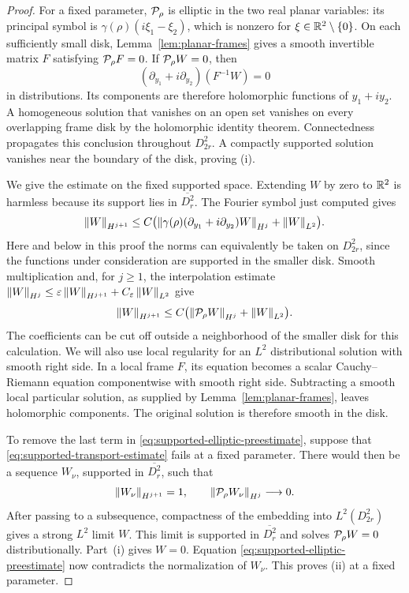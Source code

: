 \begin{proof}
For a fixed parameter, $\mathcal P_\rho$ is elliptic in the two real planar
variables: its principal symbol is
$\gamma(\rho)(i\xi_1-\xi_2)$, which is nonzero for
$\xi\in\mathbb R^2\setminus\{0\}$. On each sufficiently small disk,
Lemma~\ref{lem:planar-frames} gives a smooth invertible matrix $F$
satisfying $\mathcal P_\rho F=0$. If $\mathcal P_\rho W=0$, then
\[
 (\partial_{y_1}+i\partial_{y_2})(F^{-1}W)=0
\]
in distributions. Its components are therefore holomorphic functions
of $y_1+iy_2$. A homogeneous solution that vanishes on an open set
vanishes on every overlapping frame disk by the holomorphic identity
theorem. Connectedness propagates this conclusion throughout
$D_{2r}^2$. A compactly supported solution vanishes near the boundary
of the disk, proving \textup{(i)}.

We give the estimate on the fixed supported space. Extending $W$ by
zero to $\mathbb R^2$ is harmless because its support lies in $\overline{D_r^2}$.
The Fourier symbol just computed gives
\[
 \left\lVert W\right\rVert_{H^{j+1}}
 \leq C\bigl(
    \left\lVert \gamma(\rho)(\partial_{y_1}+i\partial_{y_2})W\right\rVert_{H^j}
       +\left\lVert W\right\rVert_{L^2}\bigr).
\]
Here and below in this proof the norms can equivalently be taken on
$D_{2r}^2$, since the functions under consideration are supported in
the smaller disk. Smooth multiplication and, for $j\geq1$, the
interpolation estimate
$\left\lVert W\right\rVert_{H^j}\leq\varepsilon\left\lVert W\right\rVert_{H^{j+1}}
 +C_\varepsilon\left\lVert W\right\rVert_{L^2}$ give
\begin{equation}\label{eq:supported-elliptic-preestimate}
 \left\lVert W\right\rVert_{H^{j+1}}
 \leq C\bigl(\left\lVert \mathcal P_\rho W\right\rVert_{H^j}
                  +\left\lVert W\right\rVert_{L^2}\bigr).
\end{equation}
The coefficients can be cut off outside a neighborhood of the smaller
disk for this calculation. We will also use local regularity for an
$L^2$ distributional solution with smooth right side. In a local frame
$F$, its equation becomes a scalar Cauchy--Riemann equation componentwise
with smooth right side. Subtracting a smooth local particular solution,
as supplied by Lemma~\ref{lem:planar-frames}, leaves holomorphic
components. The original solution is therefore smooth in the disk.

To remove the last term in \eqref{eq:supported-elliptic-preestimate},
suppose that \eqref{eq:supported-transport-estimate} fails at a fixed
parameter. There would then be a sequence $W_\nu$, supported in
$\overline{D_r^2}$, such that
\[
 \left\lVert W_\nu\right\rVert_{H^{j+1}}=1,
 \qquad
 \left\lVert \mathcal P_\rho W_\nu\right\rVert_{H^j}\longrightarrow0.
\]
After passing to a subsequence, compactness of the embedding into
$L^2(D_{2r}^2)$ gives a strong $L^2$ limit $W$. This limit is supported
in $\overline{D_r^2}$ and solves $\mathcal P_\rho W=0$ distributionally.
Part~\textup{(i)} gives $W=0$. Equation
\eqref{eq:supported-elliptic-preestimate} now contradicts the
normalization of $W_\nu$. This proves \textup{(ii)} at a fixed parameter.


\end{proof}
